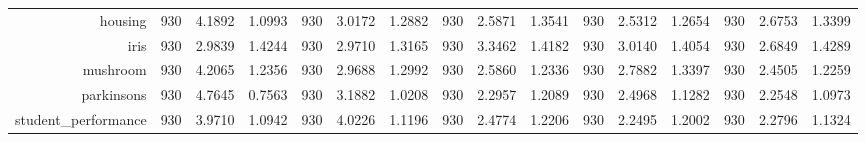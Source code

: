 \begin{table}[htbp]
{\begin{tabular}{rccccccccccccccc}
			housing                             & 930                                      & 4.1892                                                                    & 1.0993          & 930                            & 3.0172          & 1.2882          & 930                             & 2.5871          & 1.3541          & 930                             & \cellcolor[rgb]{ .776,  .937,  .808}\textcolor[rgb]{ 0,  .38,  0}{2.5312} & 1.2654          & 930                             & 2.6753                                                                             & 1.3399          \\
			iris                                & 930                                      & 2.9839                                                                    & 1.4244          & 930                            & 2.9710          & 1.3165          & 930                             & 3.3462          & 1.4182          & 930                             & 3.0140                                                                    & 1.4054          & 930                             & \cellcolor[rgb]{ .776,  .937,  .808}\textcolor[rgb]{ 0,  .38,  0}{2.6849}          & 1.4289          \\
			mushroom                            & 930                                      & 4.2065                                                                    & 1.2356          & 930                            & 2.9688          & 1.2992          & 930                             & 2.5860          & 1.2336          & 930                             & 2.7882                                                                    & 1.3397          & 930                             & \cellcolor[rgb]{ .776,  .937,  .808}\textcolor[rgb]{ 0,  .38,  0}{2.4505}          & 1.2259          \\
			parkinsons                          & 930                                      & 4.7645                                                                    & 0.7563          & 930                            & 3.1882          & 1.0208          & 930                             & 2.2957          & 1.2089          & 930                             & 2.4968                                                                    & 1.1282          & 930                             & \cellcolor[rgb]{ .776,  .937,  .808}\textcolor[rgb]{ 0,  .38,  0}{2.2548}          & 1.0973          \\
			student\_performance                & 930                                      & 3.9710                                                                    & 1.0942          & 930                            & 4.0226          & 1.1196          & 930                             & 2.4774          & 1.2206          & 930                             & \cellcolor[rgb]{ .776,  .937,  .808}\textcolor[rgb]{ 0,  .38,  0}{2.2495} & 1.2002          & 930                             & 2.2796                                                                             & 1.1324          \\

\end{tabular}}
\end{table}
